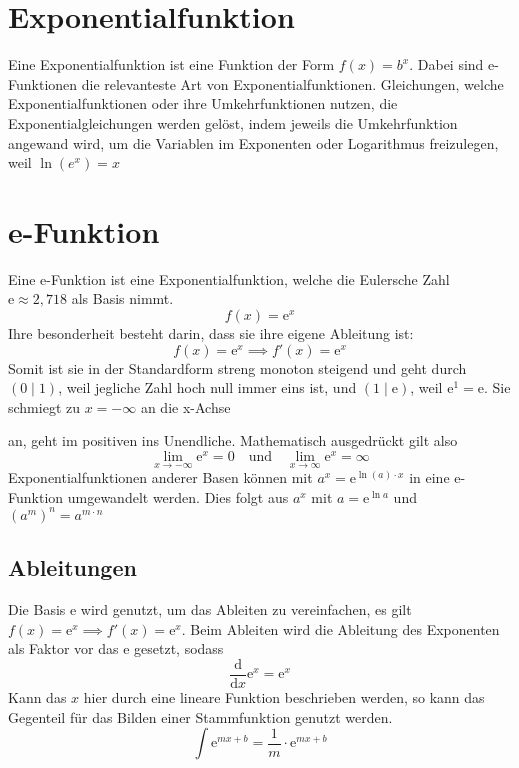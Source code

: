 \documentclass{article}
\begin{document}
  
\section{Exponentialfunktion}
Eine Exponentialfunktion ist eine Funktion der Form $f(x)=b^x$. Dabei sind e-Funktionen die relevanteste Art von Exponentialfunktionen. Gleichungen, welche Exponentialfunktionen oder ihre Umkehrfunktionen nutzen, die Exponentialgleichungen werden gelöst, indem jeweils die Umkehrfunktion angewand wird, um die Variablen im Exponenten oder Logarithmus freizulegen, weil $\ln{(e^x)}=x$
 
\section{e-Funktion} 
\begin{minipage}{5cm} 
 \centering
\end{minipage}
\hfill
\begin{minipage}{\dimexpr\textwidth-5cm} 
Eine e-Funktion ist eine Exponentialfunktion, welche die Eulersche Zahl $\mathrm{e} \approx 2,718$ als Basis nimmt.
\[
 f(x)=\mathrm{e}^x
\]
Ihre besonderheit besteht darin, dass sie ihre eigene Ableitung ist:
\[
 f(x)=\mathrm{e}^x \implies f'(x)=\mathrm{e}^x
\] 
Somit ist sie in der Standardform streng monoton steigend und geht durch ${(0 \mid 1)}$, weil jegliche Zahl hoch null immer eins ist, und $(1 \mid \mathrm{e})$, weil $\mathrm{e}^1=\mathrm{e}$. Sie schmiegt zu $x=-\infty$ an die x-Achse \par
\end{minipage}
an, geht im positiven ins Unendliche. Mathematisch ausgedrückt gilt also
\[
 \lim_{x \to -\infty} \mathrm{e}^x = 0
 \quad \text{und} \quad
 \lim_{x \to \infty} \mathrm{e}^x = \infty
\] 
Exponentialfunktionen anderer Basen können mit $a^x = \mathrm{e}^{\ln{(a)} \cdot x}$ in eine e-Funktion umgewandelt werden. Dies folgt aus $a^x$ mit $a=\mathrm{e}^{\ln{a}}$ und $(a^m)^n = a^{m \cdot n}$ 
\subsection{Ableitungen} 
Die Basis $\mathrm{e}$ wird genutzt, um das Ableiten zu vereinfachen, es gilt $f(x)=\mathrm{e}^x \implies f'(x)=\mathrm{e}^x$. \newline
Beim Ableiten wird die Ableitung des Exponenten als Faktor vor das $\mathrm{e}$ gesetzt, sodass 
\[
 \frac{\mathrm{d}}{\mathrm{d}x} \mathrm{e}^{x} = \mathrm{e}^{x} 
\] 
Kann das $x$ hier durch eine lineare Funktion beschrieben werden, so kann das Gegenteil für das Bilden einer Stammfunktion genutzt werden. 
\[
 \int \mathrm{e}^{mx+b} = \frac{1}{m} \cdot \mathrm{e}^{mx+b}
\] 
\end{document}
